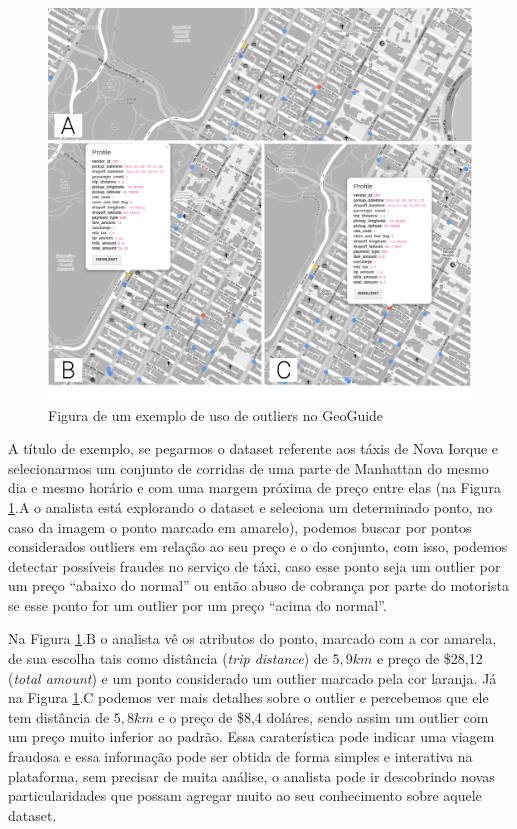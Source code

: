 \begin{figure}[t]
	\centering
	\includegraphics[width=\textwidth]{images/outliers-geoguide.png}
	\caption{Figura de um exemplo de uso de outliers no GeoGuide}
	\label{fig:outliers-geoguide}
	\vspace{-10pt}
\end{figure}

A título de exemplo, se pegarmos o dataset referente aos táxis de Nova Iorque e selecionarmos um conjunto de corridas de uma parte de Manhattan do mesmo dia e mesmo horário e com uma margem próxima de preço entre elas (na Figura \ref{fig:outliers-geoguide}.A o analista está explorando o dataset e seleciona um determinado ponto, no caso da imagem o ponto marcado em amarelo), podemos buscar por pontos considerados outliers em relação ao seu preço e o do conjunto, com isso, podemos detectar possíveis fraudes no serviço de táxi, caso esse ponto seja um outlier por um preço ``abaixo do normal'' ou então abuso de cobrança por parte do motorista se esse ponto for um outlier por um preço ``acima do normal''.

Na Figura \ref{fig:outliers-geoguide}.B o analista vê os atributos do ponto, marcado com a cor amarela, de sua escolha tais como distância (\textit{trip distance}) de $5,9km$ e preço de \$28,12  (\textit{total amount}) e um ponto considerado um outlier marcado pela cor laranja. Já na Figura \ref{fig:outliers-geoguide}.C podemos ver mais detalhes sobre o outlier e percebemos que ele tem distância de $5,8km$ e o preço de \$8,4 doláres, sendo assim um outlier com um preço muito inferior ao padrão. Essa caraterística pode indicar uma viagem fraudosa e essa informação pode ser obtida de forma simples e interativa na plataforma, sem precisar de muita análise, o analista pode ir descobrindo novas particularidades que possam agregar muito ao seu conhecimento sobre aquele dataset.

